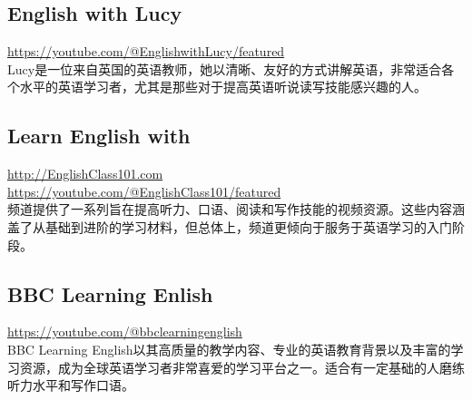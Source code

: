 \documentclass[11pt]{article}
\begin{document}
\subsection{English with Lucy}
\label{sec:org7f394f2}
\url{https://youtube.com/@EnglishwithLucy/featured} \\
Lucy是一位来自英国的英语教师，她以清晰、友好的方式讲解英语，非常适合各个水平的英语学习者，尤其是那些对于提高英语听说读写技能感兴趣的人。

\subsection{Learn English with}
\label{sec:org009f7db}
\url{http://EnglishClass101.com} \\
\url{https://youtube.com/@EnglishClass101/featured} \\
频道提供了一系列旨在提高听力、口语、阅读和写作技能的视频资源。这些内容涵盖了从基础到进阶的学习材料，但总体上，频道更倾向于服务于英语学习的入门阶段。

\subsection{BBC Learning Enlish}
\label{sec:org99b6aac}
\url{https://youtube.com/@bbclearningenglish} \\
BBC Learning English以其高质量的教学内容、专业的英语教育背景以及丰富的学习资源，成为全球英语学习者非常喜爱的学习平台之一。适合有一定基础的人磨练听力水平和写作口语。
\end{document}
